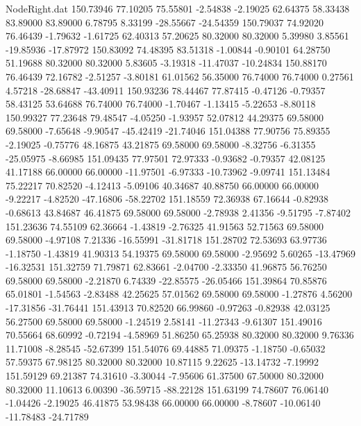 \begin{filecontents}{NodeRight.dat}
 150.73946   77.10205   75.55801    -2.54838   -2.19025   62.64375   58.33438   83.89000   83.89000    6.78795    8.33199  -28.55667  -24.54359
 150.79037   74.92020   76.46439    -1.79632   -1.61725   62.40313   57.20625   80.32000   80.32000    5.39980    3.85561  -19.85936  -17.87972
 150.83092   74.48395   83.51318    -1.00844   -0.90101   64.28750   51.19688   80.32000   80.32000    5.83605   -3.19318  -11.47037  -10.24834
 150.88170   76.46439   72.16782    -2.51257   -3.80181   61.01562   56.35000   76.74000   76.74000    0.27561    4.57218  -28.68847  -43.40911
 150.93236   78.44467   77.87415    -0.47126   -0.79357   58.43125   53.64688   76.74000   76.74000   -1.70467   -1.13415   -5.22653   -8.80118
 150.99327   77.23648   79.48547    -4.05250   -1.93957   52.07812   44.29375   69.58000   69.58000   -7.65648   -9.90547  -45.42419  -21.74046
 151.04388   77.90756   75.89355    -2.19025   -0.75776   48.16875   43.21875   69.58000   69.58000   -8.32756   -6.31355  -25.05975   -8.66985
 151.09435   77.97501   72.97333    -0.93682   -0.79357   42.08125   41.17188   66.00000   66.00000  -11.97501   -6.97333  -10.73962   -9.09741
 151.13484   75.22217   70.82520    -4.12413   -5.09106   40.34687   40.88750   66.00000   66.00000   -9.22217   -4.82520  -47.16806  -58.22702
 151.18559   72.36938   67.16644    -0.82938   -0.68613   43.84687   46.41875   69.58000   69.58000   -2.78938    2.41356   -9.51795   -7.87402
 151.23636   74.55109   62.36664    -1.43819   -2.76325   41.91563   52.71563   69.58000   69.58000   -4.97108    7.21336  -16.55991  -31.81718
 151.28702   72.53693   63.97736    -1.18750   -1.43819   41.90313   54.19375   69.58000   69.58000   -2.95692    5.60265  -13.47969  -16.32531
 151.32759   71.79871   62.83661    -2.04700   -2.33350   41.96875   56.76250   69.58000   69.58000   -2.21870    6.74339  -22.85575  -26.05466
 151.39864   70.85876   65.01801    -1.54563   -2.83488   42.25625   57.01562   69.58000   69.58000   -1.27876    4.56200  -17.31856  -31.76441
 151.43913   70.82520   66.99860    -0.97263   -0.82938   42.03125   56.27500   69.58000   69.58000   -1.24519    2.58141  -11.27343   -9.61307
 151.49016   70.55664   68.60992    -0.72194   -4.58969   51.86250   65.25938   80.32000   80.32000    9.76336   11.71008   -8.28545  -52.67399
 151.54076   69.44885   71.09375    -1.18750   -0.65032   57.59375   67.98125   80.32000   80.32000   10.87115    9.22625  -13.14732   -7.19992
 151.59129   69.21387   74.31610    -3.30044   -7.95606   61.37500   67.50000   80.32000   80.32000   11.10613    6.00390  -36.59715  -88.22128
 151.63199   74.78607   76.06140    -1.04426   -2.19025   46.41875   53.98438   66.00000   66.00000   -8.78607  -10.06140  -11.78483  -24.71789

\end{filecontents}
